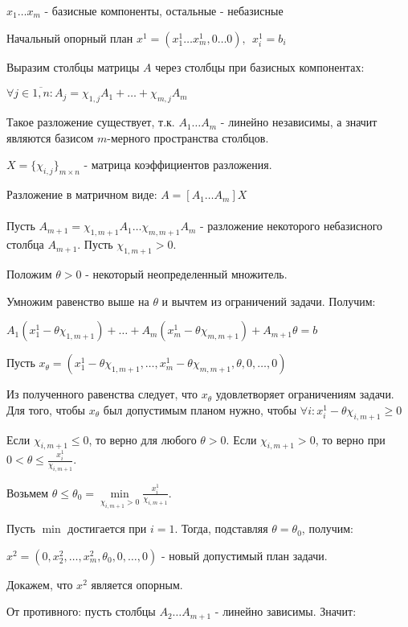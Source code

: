 \documentclass[11pt]{article}
\begin{document}
\begin{sloppypar}
\begin{enumerate}
  $x_1 \dots x_m$ - базисные компоненты, остальные - небазисные
\end{enumerate}

Начальный опорный план $x^1 = (x^1_1 \dots x^1_m, 0 \dots 0),\ \ x^1_i = b_i$

Выразим столбцы матрицы $A$ через столбцы при базисных компонентах:

$\forall j \in \overline{1, n}: A_j = \chi_{1, j}A_1 + \dots + \chi_{m, j}A_m$

Такое разложение существует, т.к. $A_1 \dots A_m$ - линейно независимы, а значит являются базисом $m$-мерного пространства столбцов.

$X = \{\chi_{i, j}\}_{m \times n}$ - матрица коэффициентов разложения.

Разложение в матричном виде: $A = [A_1 \dots A_m]X$ \\~\\

Пусть $A_{m + 1} = \chi_{1, m+1}A_1 \dots \chi_{m, m+1}A_m$ - разложение некоторого небазисного столбца $A_{m + 1}$. Пусть $\chi_{1, m+1} > 0$.

Положим $\theta > 0$ - некоторый неопределенный множитель.

Умножим равенство выше на $\theta$ и вычтем из ограничений задачи. Получим:

$A_1(x^1_1 - \theta \chi_{1, m+1}) + \dots + A_m(x^1_m - \theta \chi_{m, m+1}) + A_{m+1}\theta = b$

Пусть $x_\theta = (x^1_1 - \theta \chi_{1, m+1}, \dots, x^1_m - \theta \chi_{m, m+1}, \theta, 0, \dots, 0)$

Из полученного равенства следует, что $x_\theta$ удовлетворяет ограничениям задачи. Для того, чтобы $x_\theta$ был допустимым планом нужно, чтобы $\forall i: x^1_i - \theta \chi_{i, m+1} \geq 0$

Если $\chi_{i, m+1} \leq 0$, то верно для любого $\theta > 0$. Если $\chi_{i, m+1} > 0$, то верно при $0 < \theta \leq \frac{x^1_i}{\chi_{i, m+1}}$.

Возьмем $\theta \leq \theta_0 = \min\limits_{\chi_{i, m+1} > 0} \frac{x^1_i}{\chi_{i, m+1}}$.

Пусть $\min$ достигается при $i = 1$. Тогда, подставляя $\theta = \theta_0$, получим:

$x^2 = (0, x^2_2, \dots, x^2_m, \theta_0, 0, \dots, 0)$ - новый допустимый план задачи.

Докажем, что $x^2$ является опорным.

От противного: пусть столбцы $A_2 \dots A_{m+1}$ - линейно зависимы. Значит:


\end{sloppypar}
\end{document}
